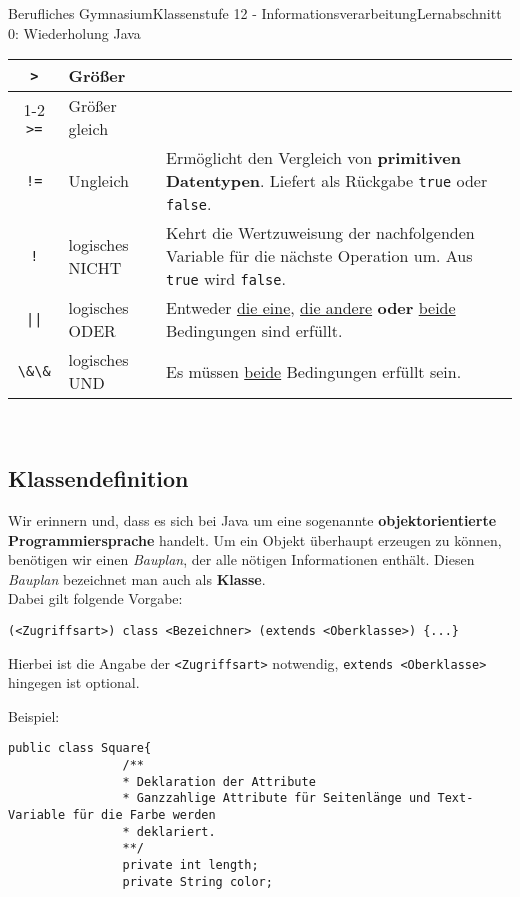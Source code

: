 \documentclass[11pt,oneside,openany,headings=optiontotoc,11pt,numbers=noenddot]{article}
\begin{document}
\begin{worksheet}{Berufliches Gymnasium}{Klassenstufe 12 - Informationsverarbeitung}{Lernabschnitt 0: Wiederholung Java}
\begin{tabularx}{\textwidth}{cXX}
			\cline{1-2}
			{\lstinline[style=JavaInputStyle]{>}} & Größer & \\
			\cline{1-2}
			{\lstinline[style=JavaInputStyle]{>=}} & Größer gleich & \\
			\hline
			{\lstinline[style=JavaInputStyle]{!=}} & Ungleich & Ermöglicht den Vergleich von \textbf{primitiven Datentypen}. Liefert als Rückgabe {\lstinline[style=JavaInputStyle]{true}} oder {\lstinline[style=JavaInputStyle]{false}}.\\
			\hline
			{\lstinline[style=JavaInputStyle]{!}} & logisches NICHT & Kehrt die Wertzuweisung der nachfolgenden Variable für die nächste Operation um. Aus {\lstinline[style=JavaInputStyle]{true}} wird {\lstinline[style=JavaInputStyle]{false}}.\\
			\hline
			{\lstinline[style=JavaInputStyle]{||}} & logisches ODER & Entweder \underline{die eine}, \underline{die andere} \textbf{oder} \underline{beide} Bedingungen sind erfüllt.\\
			\hline
			{\lstinline[style=JavaInputStyle]{\&\&}} & logisches UND & Es müssen \underline{beide} Bedingungen erfüllt sein.\\
			\hline
			\hline
		\end{tabularx}\\
		\par\noindent
		\subsection{Klassendefinition}
		Wir erinnern und, dass es sich bei Java um eine sogenannte \textbf{objektorientierte Programmiersprache} handelt. Um ein Objekt überhaupt erzeugen zu können, benötigen wir einen \textit{Bauplan}, der alle nötigen Informationen enthält. Diesen \textit{Bauplan} bezeichnet man auch als \textbf{Klasse}.\\
		Dabei gilt folgende Vorgabe:
		\begin{lstlisting}[style=JavaInputStyle]
			(<Zugriffsart>) class <Bezeichner> (extends <Oberklasse>) {...}
		\end{lstlisting}
		Hierbei ist die Angabe der \lstinline[style=JavaInputStyle]{<Zugriffsart>} notwendig, \lstinline[style=JavaInputStyle]{extends <Oberklasse>} hingegen ist optional.\\
		\par\noindent
		Beispiel:
		\begin{lstlisting}[style=JavaInputStyle,frame=single]
			public class Square{
				/**
				* Deklaration der Attribute
				* Ganzzahlige Attribute für Seitenlänge und Text-Variable für die Farbe werden
				* deklariert.
				**/
				private int length;
				private String color;
				

\end{lstlisting}
\end{worksheet}
\end{document}
